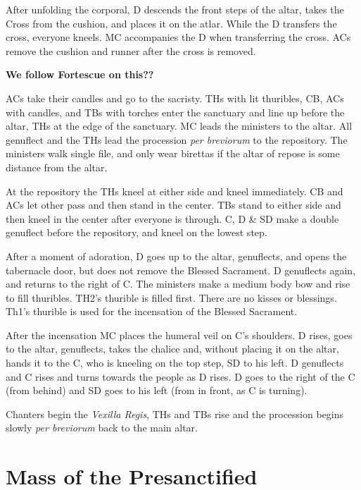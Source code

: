 {    \rubric After unfolding the corporal, D descends the front steps of the
    altar, takes the Cross from the cushion, and places it on the atlar. While
    the D transfers the cross, everyone kneels. MC accompanies the D when
    transferring the cross. ACs remove the cushion and runner after the cross
    is removed.

    \textbf{We follow Fortescue on this??}

    \rubric ACs take their candles and go to the sacristy. THs with lit
    thuribles, CB, ACs with candles, and TBs with torches enter the sanctuary
    and line up before the altar, THs at the edge of the sanctuary. MC leads
    the ministers to the altar. All genuflect and the THs lead the procession
    \textit{per breviorum} to the repository. The ministers walk single file,
    and only wear birettas if the altar of repose is some distance from the
    altar.

    \rubric At the repository the THs kneel at either side and kneel
    immediately. CB and ACs let other pass and then stand in the center. TBs
    stand to either side and then kneel in the center after everyone is
    through. C, D \& SD make a double genuflect before the repository, and
    kneel on the lowest step.

    \rubric After a moment of adoration, D goes up to the altar, genuflects,
    and opens the tabernacle door, but does not remove the Blessed Sacrament. D
    genuflects again, and returns to the right of C. The ministers make a
    medium body bow and rise to fill thuribles. TH2's thurible is filled first.
    There are no kisses or blessings. Th1's thurible is used for the
    incensation of the Blessed Sacrament.

    \rubric After the incensation MC places the humeral veil on C's shoulders.
    D rises, goes to the altar, genuflects, takes the chalice and, without
    placing it on the altar, hands it to the C, who is kneeling on the top
    step, SD to his left. D genuflects and C rises and turns towards the people
    as D rises. D goes to the right of the C (from behind) and SD goes to his
    left (from in front, as C is turning).

    \rubric Chanters begin the \textit{Vexilla Regis}, THs and TBs rise and the
    procession begins slowly \textit{per breviorum} back to the main altar.

    \section{Mass of the Presanctified}

}
